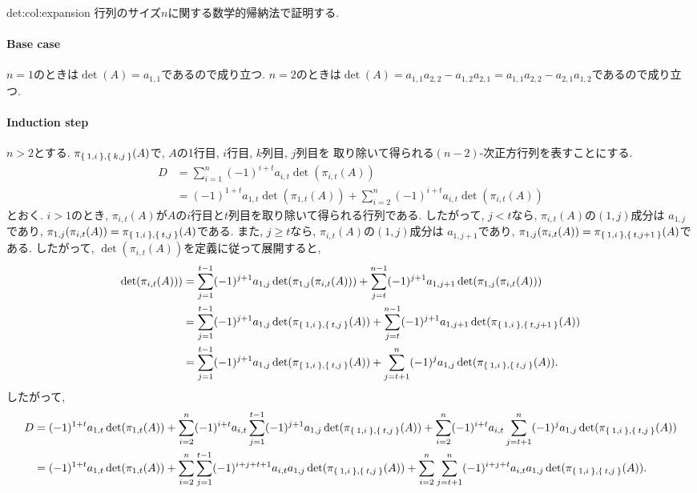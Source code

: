 \begin{proofof}{det:col:expansion}
  行列のサイズ$n$に関する数学的帰納法で証明する.
  \paragraph{Base case}
  $n=1$のときは$\det(A)=a_{1,1}$であるので成り立つ.
  $n=2$のときは$\det(A)=a_{1,1}a_{2,2}-a_{1,2}a_{2,1}=a_{1,1}a_{2,2}-a_{2,1}a_{1,2}$であるので成り立つ.

 \paragraph{Induction step}
  $n>2$とする.
  $\pi_{\Set{1,i},\Set{k,j}}(A)$で, $A$の1行目, $i$行目, $k$列目, $j$列目を
  取り除いて得られる$(n-2)$-次正方行列を表すことにする.
  \begin{align*}
    D&=\sum_{i=1}^{n}
    (-1)^{i+t}a_{i,t}\det(\pi_{i,t}(A))\\
    &=
    (-1)^{1+t}a_{1,t}\det(\pi_{1,t}(A))
    +
    \sum_{i=2}^{n}
    (-1)^{i+t}a_{i,t}
    \det(\pi_{i,t}(A))
  \end{align*}
  とおく.
  $i>1$のとき,
  $\pi_{i,t}(A)$が$A$の$i$行目と$t$列目を取り除いて得られる行列である.
  したがって,
  $j<t$なら,
  $\pi_{i,t}(A)$の$(1,j)$成分は
  $a_{1,j}$であり,
  $\pi_{1,j}(\pi_{i,t}(A))=\pi_{\Set{1,i},\Set{t,j}}(A)$である.
  また,
  $j\geq t$なら,
  $\pi_{i,t}(A)$の$(1,j)$成分は
  $a_{1,j+1}$であり,
  $\pi_{1,j}(\pi_{i,t}(A))=\pi_{\Set{1,i},\Set{t,j+1}}(A)$である.
  したがって, 
  $\det(\pi_{i,t}(A))$を定義に従って展開すると,
  \begin{align*}
    \det(\pi_{i,t}(A)))
    &=
    \sum_{j=1}^{t-1}
    (-1)^{j+1}a_{1,j}\det(\pi_{1,j}(\pi_{i,t}(A)))
    +
    \sum_{j=t}^{n-1}
    (-1)^{j+1}a_{1,j+1}\det(\pi_{1,j}(\pi_{i,t}(A)))
    \\
    &=
    \sum_{j=1}^{t-1}
    (-1)^{j+1}a_{1,j}\det(\pi_{\Set{1,i},\Set{t,j}}(A))
    +
    \sum_{j=t}^{n-1}
    (-1)^{j+1}a_{1,j+1}\det(\pi_{\Set{1,i},\Set{t,j+1}}(A))
    \\
    &=
    \sum_{j=1}^{t-1}
    (-1)^{j+1}a_{1,j}\det(\pi_{\Set{1,i},\Set{t,j}}(A))
    +
    \sum_{j=t+1}^{n}
    (-1)^{j}a_{1,j}\det(\pi_{\Set{1,i},\Set{t,j}}(A)).
  \end{align*}
  したがって,
  \begin{align*}
    D
    &=
    (-1)^{1+t}a_{1,t}\det(\pi_{1,t}(A))
    +
    \sum_{i=2}^{n}
    (-1)^{i+t}a_{i,t}
    \sum_{j=1}^{t-1}
    (-1)^{j+1}a_{1,j}\det(\pi_{\Set{1,i},\Set{t,j}}(A))
    +
    \sum_{i=2}^{n}
    (-1)^{i+t}a_{i,t}
    \sum_{j=t+1}^{n}
    (-1)^{j}a_{1,j}\det(\pi_{\Set{1,i},\Set{t,j}}(A))\\
    &=
    (-1)^{1+t}a_{1,t}\det(\pi_{1,t}(A))
    +
    \sum_{i=2}^{n}
    \sum_{j=1}^{t-1}
    (-1)^{i+j+t+1}a_{i,t}a_{1,j}\det(\pi_{\Set{1,i},\Set{t,j}}(A))
    +
    \sum_{i=2}^{n}
    \sum_{j=t+1}^{n}
    (-1)^{i+j+t}a_{i,t}a_{1,j}\det(\pi_{\Set{1,i},\Set{t,j}}(A)).
  \end{align*}
  

\end{proofof}

